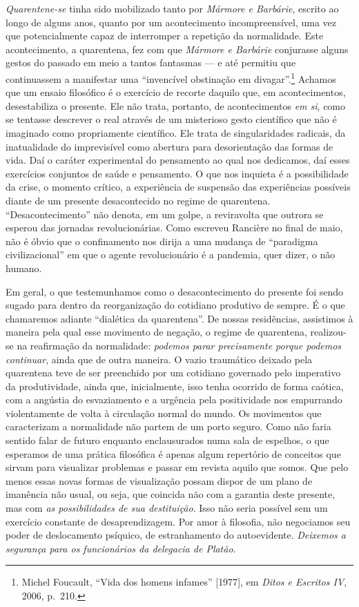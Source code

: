 \textit{Quarentene-se} tinha sido mobilizado tanto por \textit{Mármore e
Barbárie}, escrito ao longo de alguns anos, quanto por um acontecimento
incompreensível, uma vez que potencialmente capaz de interromper a
repetição da normalidade. Este acontecimento, a quarentena, fez com que
\textit{Mármore e Barbárie} conjurasse alguns gestos do passado em meio a
tantos fantasmas --- e até permitiu que continuassem a manifestar uma
``invencível obstinação em divagar''.\footnote{Michel Foucault, ``Vida
  dos homens infames'' {[}1977{]}, em \textit{Ditos e Escritos IV}, 2006,
  p.~210.} Achamos que um ensaio filosófico é o exercício de recorte
daquilo que, em acontecimentos, desestabiliza o presente. Ele não trata,
portanto, de acontecimentos \textit{em si}, como se tentasse descrever o
real através de um misterioso gesto científico que não é imaginado como
propriamente científico. Ele trata de singularidades radicais, da
inatualidade do imprevisível como abertura para desorientação das formas
de vida. Daí o caráter experimental do pensamento ao qual nos dedicamos,
daí esses exercícios conjuntos de saúde e pensamento. O que nos inquieta
é a possibilidade da crise, o momento crítico, a experiência de
suspensão das experiências possíveis diante de um presente desacontecido
no regime de quarentena. ``Desacontecimento'' não denota, em um golpe, a
reviravolta que outrora se esperou das jornadas revolucionárias. Como
escreveu Rancière no final de maio, não é óbvio que o confinamento nos
dirija a uma mudança de ``paradigma civilizacional'' em que o agente
revolucionário é a pandemia, quer dizer, o não humano.~

Em geral, o que testemunhamos como o desacontecimento do presente foi
sendo sugado para dentro da reorganização do cotidiano produtivo de
sempre. É o que chamaremos adiante ``dialética da quarentena''. De
nossas residências, assistimos à maneira pela qual esse movimento de
negação, o regime de quarentena, realizou-se na reafirmação da
normalidade: \textit{podemos parar precisamente porque podemos continuar},
ainda que de outra maneira. O vazio traumático deixado pela quarentena
teve de ser preenchido por um cotidiano governado pelo imperativo da
produtividade, ainda que, inicialmente, isso tenha ocorrido de forma
caótica, com a angústia do esvaziamento e a urgência pela positividade
nos empurrando violentamente de volta à circulação normal do mundo. Os
movimentos que caracterizam a normalidade não partem de um porto seguro.
Como não faria sentido falar de futuro enquanto enclausurados numa sala
de espelhos, o que esperamos de uma prática filosófica é apenas algum
repertório de conceitos que sirvam para visualizar problemas e passar em
revista aquilo que somos. Que pelo menos essas novas formas de
visualização possam dispor de um plano de imanência não usual, ou seja,
que coincida não com a garantia deste presente, mas com \textit{as
possibilidades de sua destituição}. Isso não seria possível sem um
exercício constante de desaprendizagem. Por amor à filosofia, não
negociamos seu poder de deslocamento psíquico, de estranhamento do
autoevidente. \textit{Deixemos a segurança para os funcionários da
delegacia de Platão}.


